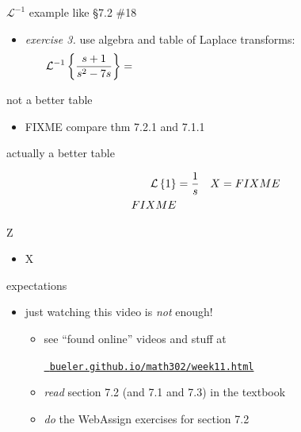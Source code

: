 \documentclass[urlcolor=blue,dvipsnames]{beamer}
\begin{document}
\begin{frame}{$\mathcal{L}^{-1}$ example like \S7.2 \#18}

\begin{itemize}
\item \emph{exercise 3.}  use algebra and table of Laplace transforms:
    $$\LLi{\frac{s+1}{s^2-7s}} = \hspace{80mm}$$
\end{itemize}

\vspace{50mm}
\end{frame}


\begin{frame}{not a better table}

\begin{itemize}
\item FIXME compare thm 7.2.1 and 7.1.1
\end{itemize}
\end{frame}


\begin{frame}{actually a better table}

\begin{align*}
\mathcal{L}\left\{1\right\} &= \frac{1}{s} & X&=FIXME \\ FIXME
\end{align*}
\end{frame}


\begin{frame}{Z}

\begin{itemize}
\item X
\end{itemize}
\end{frame}


\begin{frame}{expectations}

\begin{itemize}
\item just watching this video is \emph{not} enough!
     \begin{itemize}
     \item see ``found online'' videos and stuff at

     \centerline{\href{https://bueler.github.io/math302/week11.html}{\tt \color{cyan} bueler.github.io/math302/week11.html}}
     \item \emph{read} section 7.2 (and 7.1 and 7.3) in the textbook
     \item \emph{do} the WebAssign exercises for section 7.2
     \end{itemize}
\end{itemize}
\end{frame}
\end{document}
